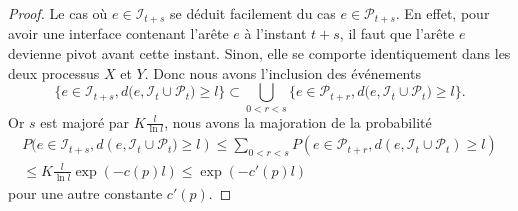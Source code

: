 \documentclass[titlepage,a4paper,12pt]{article}
\begin{document}
\begin{proof}
Le cas où $e\in \mathcal{I}_{t+s}$ se déduit facilement du cas $e\in \mathcal{P}_{t+s}$. En effet, pour avoir une interface contenant l'arête $e$ à l'instant $t+s$, il faut que l'arête $e$ devienne pivot avant cette instant. Sinon, elle se comporte identiquement dans les deux processus $X$ et $Y$. Donc nous avons l'inclusion des événements 
$$ \big\{ e\in \mathcal{I}_{t+s}, d(e,\mathcal{I}_t \cup \mathcal{P}_{t}\big) \geqslant l\} \subset \bigcup_{0<r<s}\big\{ e\in \mathcal{P}_{t+r}, d(e,\mathcal{I}_t \cup \mathcal{P}_{t}\big) \geqslant l\}.
$$
Or $s$ est majoré par $\displaystyle K\frac{l}{\ln l}$, nous avons la majoration de la probabilité
\begin{multline*} P(e\in \mathcal{I}_{t+s}, d(e,\mathcal{I}_t \cup \mathcal{P}_{t}\big) \geqslant l) \leqslant \sum_{0<r<s} P(e\in \mathcal{P}_{t+r}, d(e,\mathcal{I}_t \cup \mathcal{P}_{t})\geqslant l) \\ \leqslant K\frac{l}{\ln l}\exp(-c(p)l)\leqslant \exp(-c'(p)l)
\end{multline*}
pour une autre constante $c'(p)$. 
\end{proof}
\end{document}
